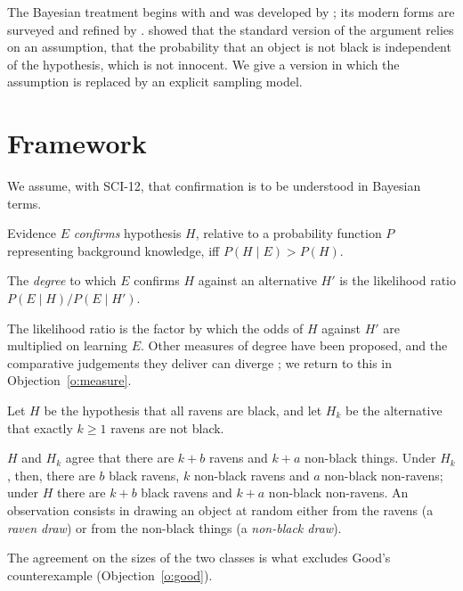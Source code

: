 \documentclass{situationist-preprint}
\begin{document}
The Bayesian treatment begins with \citet{HosiassonLindenbaum1940} and was developed by \citet{Mackie1963}; its modern forms are surveyed and refined by \citet{FitelsonHawthorne2010}. \citet{Vranas2004} showed that the standard version of the argument relies on an assumption, that the probability that an object is not black is independent of the hypothesis, which is not innocent. We give a version in which the assumption is replaced by an explicit sampling model.

\section{Framework}

We assume, with SCI-12, that confirmation is to be understood in Bayesian terms.

\begin{definition}[Confirmation]\label{d:conf}
Evidence $E$ \emph{confirms} hypothesis $H$, relative to a probability function $P$ representing background knowledge, iff $P(H \mid E) > P(H)$.
\end{definition}

\begin{definition}[Degree]\label{d:degree}
The \emph{degree} to which $E$ confirms $H$ against an alternative $H'$ is the likelihood ratio $P(E \mid H) / P(E \mid H')$.
\end{definition}

The likelihood ratio is the factor by which the odds of $H$ against $H'$ are multiplied on learning $E$. Other measures of degree have been proposed, and the comparative judgements they deliver can diverge \citep{Fitelson1999}; we return to this in Objection~\ref{o:measure}.

Let $H$ be the hypothesis that all ravens are black, and let $H_k$ be the alternative that exactly $k \geq 1$ ravens are not black.

\begin{assumption}[Sampling]\label{a:sampling}
$H$ and $H_k$ agree that there are $k + b$ ravens and $k + a$ non-black things. Under $H_k$, then, there are $b$ black ravens, $k$ non-black ravens and $a$ non-black non-ravens; under $H$ there are $k+b$ black ravens and $k+a$ non-black non-ravens. An observation consists in drawing an object at random either from the ravens (a \emph{raven draw}) or from the non-black things (a \emph{non-black draw}).
\end{assumption}

The agreement on the sizes of the two classes is what excludes Good's counterexample (Objection~\ref{o:good}).
\end{document}

